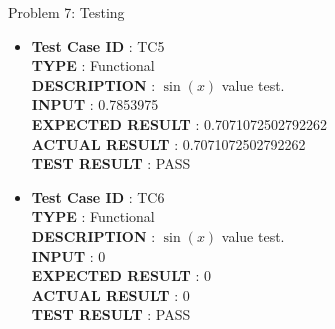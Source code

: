 \documentclass[a4paper,12pt]{article}
\begin{document}
\begin{section}{Problem 7: Testing}
\begin{itemize}
\subsubsection{$\sin(x)$ Testing Reports}
	
\item \textbf{Test Case ID} \hspace{1.85cm} : TC5  \\
\textbf{TYPE } \hspace{3.05cm}  : Functional\\
\textbf{DESCRIPTION }\hspace{1.15cm} : $\sin(x)$ value test. \\
\textbf{INPUT} \hspace{3.05cm} :  0.7853975 \\
\textbf{EXPECTED RESULT} \hspace{0.01cm} : 0.7071072502792262 \\
\textbf{ACTUAL RESULT} \hspace{0.6cm} : 0.7071072502792262 \\
\textbf{TEST RESULT} \hspace{1.45cm} : PASS \\

\item \textbf{Test Case ID} \hspace{1.85cm} : TC6  \\
\textbf{TYPE } \hspace{3.05cm}  : Functional\\
\textbf{DESCRIPTION }\hspace{1.15cm} : $\sin(x)$ value test. \\
\textbf{INPUT} \hspace{3.05cm} :  0 \\
\textbf{EXPECTED RESULT} \hspace{0.01cm} : 0 \\
\textbf{ACTUAL RESULT} \hspace{0.6cm} : 0 \\
\textbf{TEST RESULT} \hspace{1.45cm} : PASS \\	


\end{itemize}
\end{section}
\end{document}
